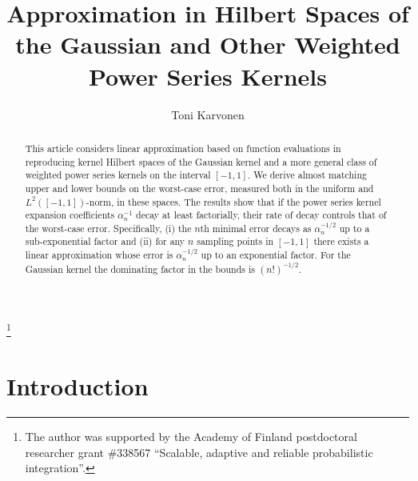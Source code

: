 \documentclass{mcom-l}
\numberwithin{equation}{section}
\numberwithin{theorem}{section} %
\begin{document}
\title[Approximation in Hilbert Spaces of Weighted Power Series Kernels]{Approximation in Hilbert Spaces of the Gaussian and Other Weighted Power Series Kernels}


\author{Toni Karvonen}
\address{Department of Mathematics and Statistics, University of Helsinki, Finland.}
\curraddr{}
\thanks{The author was supported by the Academy of Finland postdoctoral researcher grant \#338567 ``Scalable, adaptive and reliable probabilistic integration''.}

\date{}
\dedicatory{}

\begin{abstract}
  This article considers linear approximation based on function evaluations in reproducing kernel Hilbert spaces of the Gaussian kernel and a more general class of weighted power series kernels on the interval $[-1, 1]$.
  We derive almost matching upper and lower bounds on the worst-case error, measured both in the uniform and $L^2([-1,1])$-norm, in these spaces.
  The results show that if the power series kernel expansion coefficients $\alpha_n^{-1}$ decay at least factorially, their rate of decay controls that of the worst-case error.
  Specifically, (i) the $n$th minimal error decays as $\alpha_n^{{\scriptscriptstyle -1/2}}$ up to a sub-exponential factor and (ii) for any $n$ sampling points in $[-1, 1]$ there exists a linear approximation whose error is $\alpha_n^{{\scriptscriptstyle -1/2}}$ up to an exponential factor.
  For the Gaussian kernel the dominating factor in the bounds is $(n!)^{-1/2}$.
\end{abstract}

\maketitle

\section{Introduction}
\end{document}
